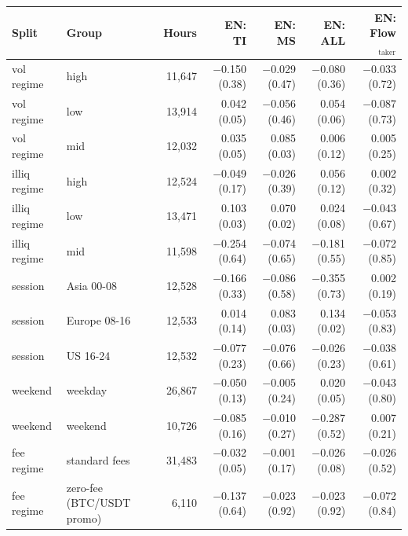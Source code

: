\begin{tabular}{llrrrrr}
\toprule
Split & Group & Hours & EN: TI & EN: MS & EN: ALL & EN: Flow$_{\text{taker}}$\\
\midrule
vol regime & high & 11,647 & \ensuremath{-}0.150 (0.38) & \ensuremath{-}0.029 (0.47) & \ensuremath{-}0.080 (0.36) & \ensuremath{-}0.033 (0.72)\\
vol regime & low & 13,914 & 0.042 (0.05) & \ensuremath{-}0.056 (0.46) & 0.054 (0.06) & \ensuremath{-}0.087 (0.73)\\
vol regime & mid & 12,032 & 0.035 (0.05) & 0.085 (0.03) & 0.006 (0.12) & 0.005 (0.25)\\
illiq regime & high & 12,524 & \ensuremath{-}0.049 (0.17) & \ensuremath{-}0.026 (0.39) & 0.056 (0.12) & 0.002 (0.32)\\
illiq regime & low & 13,471 & 0.103 (0.03) & 0.070 (0.02) & 0.024 (0.08) & \ensuremath{-}0.043 (0.67)\\
illiq regime & mid & 11,598 & \ensuremath{-}0.254 (0.64) & \ensuremath{-}0.074 (0.65) & \ensuremath{-}0.181 (0.55) & \ensuremath{-}0.072 (0.85)\\
session & Asia 00-08 & 12,528 & \ensuremath{-}0.166 (0.33) & \ensuremath{-}0.086 (0.58) & \ensuremath{-}0.355 (0.73) & 0.002 (0.19)\\
session & Europe 08-16 & 12,533 & 0.014 (0.14) & 0.083 (0.03) & 0.134 (0.02) & \ensuremath{-}0.053 (0.83)\\
session & US 16-24 & 12,532 & \ensuremath{-}0.077 (0.23) & \ensuremath{-}0.076 (0.66) & \ensuremath{-}0.026 (0.23) & \ensuremath{-}0.038 (0.61)\\
weekend & weekday & 26,867 & \ensuremath{-}0.050 (0.13) & \ensuremath{-}0.005 (0.24) & 0.020 (0.05) & \ensuremath{-}0.043 (0.80)\\
weekend & weekend & 10,726 & \ensuremath{-}0.085 (0.16) & \ensuremath{-}0.010 (0.27) & \ensuremath{-}0.287 (0.52) & 0.007 (0.21)\\
fee regime & standard fees & 31,483 & \ensuremath{-}0.032 (0.05) & \ensuremath{-}0.001 (0.17) & \ensuremath{-}0.026 (0.08) & \ensuremath{-}0.026 (0.52)\\
fee regime & zero-fee (BTC/USDT promo) & 6,110 & \ensuremath{-}0.137 (0.64) & \ensuremath{-}0.023 (0.92) & \ensuremath{-}0.023 (0.92) & \ensuremath{-}0.072 (0.84)\\
\bottomrule
\end{tabular}
